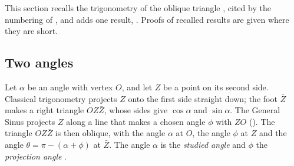 \documentclass[11pt,a4paper]{amsart}
\theoremstyle{plain}
\theoremstyle{definition}
\theoremstyle{remark}
\newcommand{\Zb}{\bar{Z}}                        %
\begin{document}
This section recalls the trigonometry of the oblique triangle \citep{Derraz2017,Derraz2026GSP}, cited by the numbering of \citep{Derraz2026GSP}, and adds one result, . Proofs of recalled results are given where they are short.

\subsection{Two angles}\label{subsec:gs-angles}

Let $\alpha$ be an angle with vertex $O$, and let $Z$ be a point on its second side. Classical trigonometry projects $Z$ onto the first side straight down; the foot $\Zb$ makes a right triangle $OZ\Zb$, whose sides give $\cos\alpha$ and $\sin\alpha$. The General Sinus projects $Z$ along a line that makes a chosen angle $\phi$ with $ZO$ (). The triangle $OZ\Zb$ is then oblique, with the angle $\alpha$ at $O$, the angle $\phi$ at $Z$ and the angle $\theta = \pi - (\alpha + \phi)$ at $\Zb$. The angle $\alpha$ is the \emph{studied angle} and $\phi$ the \emph{projection angle} \citep[Definition~2.6]{Derraz2026GSP}.
\end{document}
